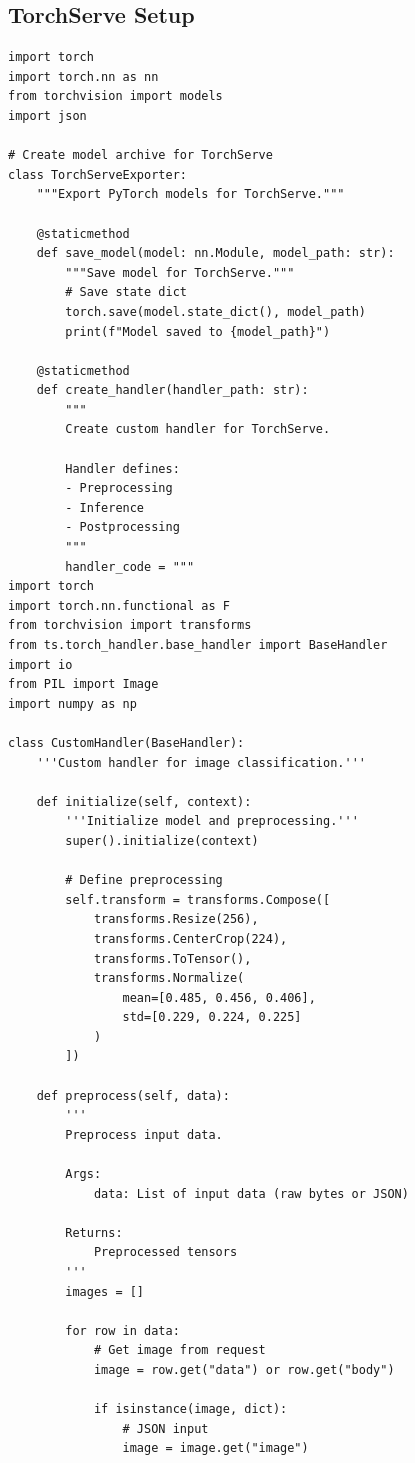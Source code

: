 \subsection{TorchServe Setup}

\begin{lstlisting}[style=python, caption=Prepare PyTorch model for TorchServe]
import torch
import torch.nn as nn
from torchvision import models
import json

# Create model archive for TorchServe
class TorchServeExporter:
    """Export PyTorch models for TorchServe."""

    @staticmethod
    def save_model(model: nn.Module, model_path: str):
        """Save model for TorchServe."""
        # Save state dict
        torch.save(model.state_dict(), model_path)
        print(f"Model saved to {model_path}")

    @staticmethod
    def create_handler(handler_path: str):
        """
        Create custom handler for TorchServe.

        Handler defines:
        - Preprocessing
        - Inference
        - Postprocessing
        """
        handler_code = """
import torch
import torch.nn.functional as F
from torchvision import transforms
from ts.torch_handler.base_handler import BaseHandler
import io
from PIL import Image
import numpy as np

class CustomHandler(BaseHandler):
    '''Custom handler for image classification.'''

    def initialize(self, context):
        '''Initialize model and preprocessing.'''
        super().initialize(context)

        # Define preprocessing
        self.transform = transforms.Compose([
            transforms.Resize(256),
            transforms.CenterCrop(224),
            transforms.ToTensor(),
            transforms.Normalize(
                mean=[0.485, 0.456, 0.406],
                std=[0.229, 0.224, 0.225]
            )
        ])

    def preprocess(self, data):
        '''
        Preprocess input data.

        Args:
            data: List of input data (raw bytes or JSON)

        Returns:
            Preprocessed tensors
        '''
        images = []

        for row in data:
            # Get image from request
            image = row.get("data") or row.get("body")

            if isinstance(image, dict):
                # JSON input
                image = image.get("image")


\end{lstlisting}
